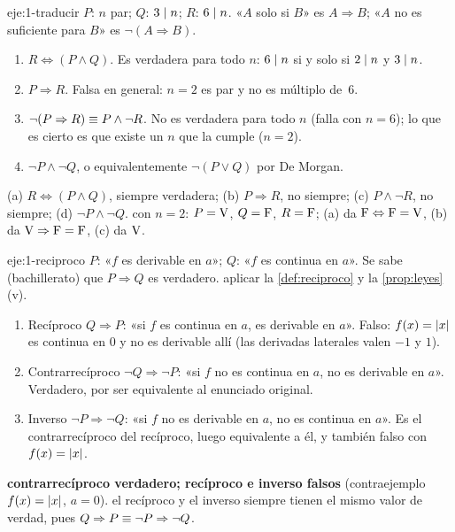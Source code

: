 \begin{solucion}{eje:1-traducir}
\datos $P$: $n$ par; $Q$: $3\mid n$; $R$: $6\mid n$.
\planteamiento «$A$ solo si $B$» es $A\Rightarrow B$; «$A$ no es suficiente para $B$» es $\neg(A\Rightarrow B)$.
\pasos
\begin{enumerate}[label=(\alph*)]
  \item $R\Leftrightarrow(P\wedge Q)$. Es verdadera para todo $n$: $6\mid n$ si y solo si $2\mid n$ y $3\mid n$.
  \item $P\Rightarrow R$. Falsa en general: $n=2$ es par y no es múltiplo de~6.
  \item $\neg(P\Rightarrow R)\equiv P\wedge\neg R$. No es verdadera para todo $n$ (falla con $n=6$); lo que es cierto es que existe un $n$ que la cumple ($n=2$).
  \item $\neg P\wedge\neg Q$, o equivalentemente $\neg(P\vee Q)$ por De Morgan.
\end{enumerate}
\resultado (a) $R\Leftrightarrow(P\wedge Q)$, siempre verdadera; (b) $P\Rightarrow R$, no siempre; (c) $P\wedge\neg R$, no siempre; (d) $\neg P\wedge\neg Q$.
\comprobacion con $n=2$: $P=\mathrm{V}$, $Q=\mathrm{F}$, $R=\mathrm{F}$; (a) da $\mathrm{F}\Leftrightarrow\mathrm{F}=\mathrm{V}$, (b) da $\mathrm{V}\Rightarrow\mathrm{F}=\mathrm{F}$, (c) da $\mathrm{V}$.
\end{solucion}

\begin{solucion}{eje:1-reciproco}
\datos $P$: «$f$ es derivable en $a$»; $Q$: «$f$ es continua en $a$». Se sabe (bachillerato) que $P\Rightarrow Q$ es verdadero.
\planteamiento aplicar la \cref{def:reciproco} y la \cref{prop:leyes}(v).
\pasos
\begin{enumerate}[label=\arabic*.]
  \item Recíproco $Q\Rightarrow P$: «si $f$ es continua en $a$, es derivable en $a$». Falso: $f(x)=\lvert x\rvert$ es continua en $0$ y no es derivable allí (las derivadas laterales valen $-1$ y $1$).
  \item Contrarrecíproco $\neg Q\Rightarrow\neg P$: «si $f$ no es continua en $a$, no es derivable en $a$». Verdadero, por ser equivalente al enunciado original.
  \item Inverso $\neg P\Rightarrow\neg Q$: «si $f$ no es derivable en $a$, no es continua en $a$». Es el contrarrecíproco del recíproco, luego equivalente a él, y también falso con $f(x)=\lvert x\rvert$.
\end{enumerate}
\resultado \textbf{contrarrecíproco verdadero; recíproco e inverso falsos} (contraejemplo $f(x)=\lvert x\rvert$, $a=0$).
\comprobacion el recíproco y el inverso siempre tienen el mismo valor de verdad, pues $Q\Rightarrow P\equiv\neg P\Rightarrow\neg Q$.
\end{solucion}

